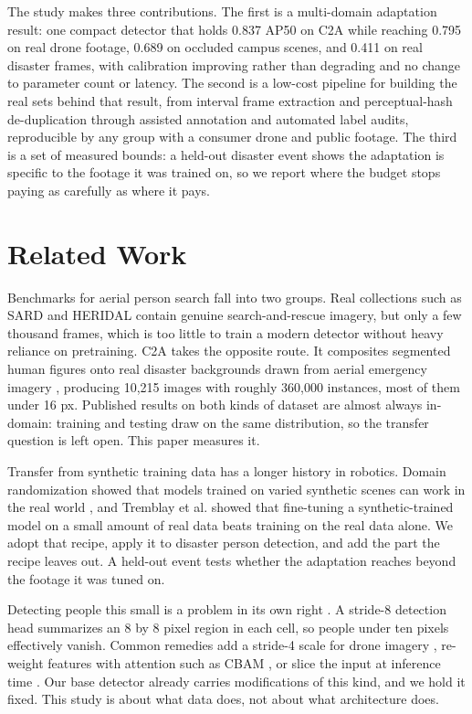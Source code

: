 \documentclass[conference,a4paper]{IEEEtran}
\begin{document}
The study makes three contributions. The first is a multi-domain adaptation
result: one compact detector that holds 0.837 AP50 on C2A while reaching 0.795
on real drone footage, 0.689 on occluded campus scenes, and 0.411 on real
disaster frames, with calibration improving rather than degrading and no change
to parameter count or latency. The second is a low-cost pipeline for building
the real sets behind that result, from interval frame extraction and
perceptual-hash de-duplication through assisted annotation and automated label
audits, reproducible by any group with a consumer drone and public footage. The
third is a set of measured bounds: a held-out disaster event shows the
adaptation is specific to the footage it was trained on, so we report where the
budget stops paying as carefully as where it pays.

\section{Related Work}
Benchmarks for aerial person search fall into two groups. Real collections such
as SARD \cite{sambolek2021sard} and HERIDAL \cite{bozic2019heridal} contain
genuine search-and-rescue imagery, but only a few thousand frames, which is too
little to train a modern detector without heavy reliance on pretraining. C2A
\cite{nihal2024c2a} takes the opposite route. It composites segmented human
figures onto real disaster backgrounds drawn from aerial emergency imagery
\cite{kyrkou2020aider}, producing 10,215 images with roughly 360,000 instances,
most of them under 16 px. Published results on both kinds of dataset are almost
always in-domain: training and testing draw on the same distribution, so the
transfer question is left open. This paper measures it.

Transfer from synthetic training data has a longer history in robotics. Domain
randomization showed that models trained on varied synthetic scenes can work in
the real world \cite{tobin2017domainrand}, and Tremblay et al.
\cite{tremblay2018synthetic} showed that fine-tuning a synthetic-trained model
on a small amount of real data beats training on the real data alone. We adopt
that recipe, apply it to disaster person detection, and add the part the recipe
leaves out. A held-out event tests whether the adaptation reaches beyond the
footage it was tuned on.

Detecting people this small is a problem in its own right
\cite{cheng2023smallobject}. A stride-8 detection head summarizes an 8 by 8
pixel region in each cell, so people under ten pixels effectively vanish.
Common remedies add a stride-4 scale for drone imagery \cite{zhu2021tphyolov5},
re-weight features with attention such as CBAM \cite{woo2018cbam}, or slice the
input at inference time \cite{akyon2022sahi}. Our base detector already carries
modifications of this kind, and we hold it fixed. This study is about what data
does, not about what architecture does.
\end{document}
